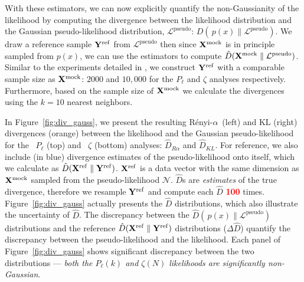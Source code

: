 \documentclass[12pt, letterpaper, preprint]{aastex}
\newcommand{\todo}[1]{{\bf \textcolor{red}{#1}}}
\newcommand{\Xmock}{{\bf X}^\mathrm{mock}}
\newcommand{\Xref}{{\bf X}^\mathrm{ref}}
\newcommand{\Yref}{{\bf Y}^\mathrm{ref}}
\newcommand{\Ralpha}{R\'enyi-$\alpha$}
\newcommand{\Beut}{\citetalias{beutler2017}}
\newcommand{\Sinh}{\citetalias{sinha2017}}
\begin{document}
With these estimators, we can now explicitly quantify the 
non-Gaussianity of the likelihood by computing the divergence 
between the likelihood distribution and the Gaussian 
pseudo-likelihood distribution, $\mathcal{L}^\mathrm{pseudo}$:
$D(\, p(x) \parallel \mathcal{L}^\mathrm{pseudo})$.%
We draw a reference sample ${\bf Y}^\mathrm{ref}$ from 
$\mathcal{L}^\mathrm{pseudo}$ then %
since $\Xmock$ is in principle sampled from $p(x)$, we can use the 
estimators to compute $\hat{D}(\Xmock \parallel \mathcal{L}^\mathrm{pseudo})$.
Similar to the experiments detailed in \cite{poczos2012}, 
we construct ${\bf Y}^\mathrm{ref}$ with a comparable sample size as $\Xmock$: 
$2000$ and $10,000$ for the $P_\ell$ and $\zeta$ analyses respectively. 
Furthermore, based on the sample size of $\Xmock$ we calculate the 
divergences using the $k=10$ nearest neighbors. 

In Figure~\ref{fig:div_gauss}, we present the resulting \Ralpha~(left) 
and KL (right) divergences (orange) between the likelihood and the 
Gaussian pseudo-likelihood for the \Beut~$P_\ell$ (top) and \Sinh~$\zeta$ (bottom) 
analyses: $\hat{D}_{R\alpha}$ and $\hat{D}_{KL}$. For reference, we also 
include (in blue) divergence estimates of the pseudo-likelihood onto itself, 
which we calculate as $\hat{D}(\Xref \parallel \Yref)$. $\Xref$ is a 
data vector with the same dimension as $\Xmock$ sampled from the pseudo-likelihood 
$\mathcal{N}$. $\hat{D}$s are \emph{estimates} of the true divergence, 
therefore we resample $\Yref$ and compute each $\hat{D}$ \todo{100} times. 
Figure~\ref{fig:div_gauss} actually presents the $\hat{D}$ distributions, 
which also illustrate the uncertainty of $\hat{D}$. The discrepancy between 
the $\hat{D}(\, p(x) \parallel \mathcal{L}^\mathrm{pseudo})$
distributions and the reference $\hat{D}(\Xref \parallel \Yref)$ distributions 
($\Delta \hat{D}$) quantify the discrepancy between the pseudo-likelihood
and the likelihood. Each panel of Figure~\ref{fig:div_gauss} shows significant 
discrepancy between the two distributions --- \emph{both 
the $P_\ell(k)$ and $\zeta(N)$ likelihoods are significantly non-Gaussian}. 
\end{document}
